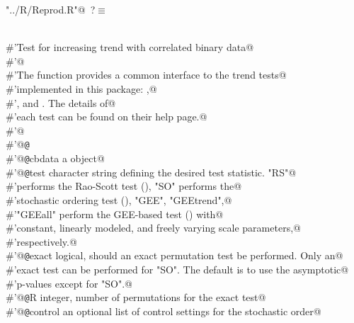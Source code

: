 \documentclass[reqno]{amsart}
\renewcommand{\NWtarget}[2]{\hypertarget{#1}{#2}}
\begin{document}
\begin{flushleft} \small\label{scrap40}\raggedright\small
\NWtarget{nuweb?}{} \verb@"../R/Reprod.R"@\nobreak\ {\footnotesize {?}}$\equiv$
\vspace{-1ex}
\begin{list}{}{} \item
\mbox{}\verb@@\\
\mbox{}\verb@#'Test for increasing trend with correlated binary data@\\
\mbox{}\verb@#'@\\
\mbox{}\verb@#'The  function provides a common interface to the trend tests@\\
\mbox{}\verb@#'implemented in this package: ,@\\
\mbox{}\verb@#', and . The details of@\\
\mbox{}\verb@#'each test can be found on their help page.@\\
\mbox{}\verb@#'@\\
\mbox{}\verb@#'@{\tt @}\verb@export@\\
\mbox{}\verb@#'@{\tt @}\verb@param cbdata a  object@\\
\mbox{}\verb@#'@{\tt @}\verb@param test character string defining the desired test statistic. "RS"@\\
\mbox{}\verb@#'performs the Rao-Scott test (), "SO" performs the@\\
\mbox{}\verb@#'stochastic ordering test (), "GEE", "GEEtrend",@\\
\mbox{}\verb@#'"GEEall" perform the GEE-based test () with@\\
\mbox{}\verb@#'constant, linearly modeled, and freely varying scale parameters,@\\
\mbox{}\verb@#'respectively.@\\
\mbox{}\verb@#'@{\tt @}\verb@param exact logical, should an exact permutation test be performed. Only an@\\
\mbox{}\verb@#'exact test can be performed for "SO". The default is to use the asymptotic@\\
\mbox{}\verb@#'p-values except for "SO".@\\
\mbox{}\verb@#'@{\tt @}\verb@param R integer, number of permutations for the exact test@\\
\mbox{}\verb@#'@{\tt @}\verb@param control an optional list of control settings for the stochastic order@\\

\end{list}
\end{flushleft}
\end{document}
